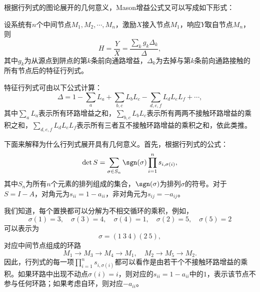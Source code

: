 根据行列式的图论展开的几何意义，Mason增益公式又可以写成如下形式：
\begin{theorem}\label{thm:mason_gain}
    设系统有$n$个中间节点$M_1,M_2,\cdots,M_n$，激励$X$接入节点$M_1$，响应$Y$取自节点$M_n$，则
    \begin{equation}
        H=\frac{Y}{X}=\frac{\sum_{k}g_k\Delta_k}{\Delta},
    \end{equation}
    其中$g_k$为从源点到阱点的第$k$条前向通路增益，$\Delta_k$为去掉与第$k$条前向通路接触的所有节点后的特征行列式。

    特征行列式可由以下公式计算：
    \begin{equation}
        \Delta=1-\sum_a L_a+\sum_{b,c}L_b L_c-\sum_{d,e,f}L_d L_e L_f+\cdots,
    \end{equation}
    其中$\sum_a L_a$表示所有环路增益之和，$\sum_{b,c}L_b L_c$表示所有两两不接触环路增益的乘积之和，$\sum_{d,e,f}L_d L_e L_f$表示所有三者互不接触环路增益的乘积之和，依此类推。
\end{theorem}

下面来解释为什么行列式展开具有几何意义。首先，根据行列式的公式：
\begin{equation}
    \det S=\sum_{\sigma\in S_n}\sgn(\sigma)\prod_{i=1}^{n}s_{i,\sigma(i)},
\end{equation}
其中$S_n$为所有$n$个元素的排列组成的集合，$\sgn(\sigma)$为排列$\sigma$的符号。对于$S=I-A$，对角元为$s_{ii}=1-a_{ii}$，非对角元为$s_{ij}=-a_{ij}$。

我们知道，每个置换都可以分解为不相交循环的乘积，例如，
\begin{equation}
    \sigma(1)=3,\quad \sigma(3)=4,\quad \sigma(4)=1,\quad \sigma(2)=5,\quad \sigma(5)=2
\end{equation}
可以表示为
\begin{equation}
    \sigma=(1\ 3\ 4)(2\ 5),
\end{equation}
对应中间节点组成的环路
\begin{equation}
    M_1\to M_3\to M_4\to M_1,\quad M_2\to M_5\to M_2.
\end{equation}
因此，行列式的每一项$\prod_{i=1}^{n}s_{i,\sigma(i)}$都可以看作是由若干个不接触环路增益的乘积。如果环路中出现不动点$\sigma(i)=i$，则对应的$s_{ii}=1-a_{ii}$中的$1$，表示该节点不参与任何环路；如果考虑自环，则对应$-a_{ii}$。

